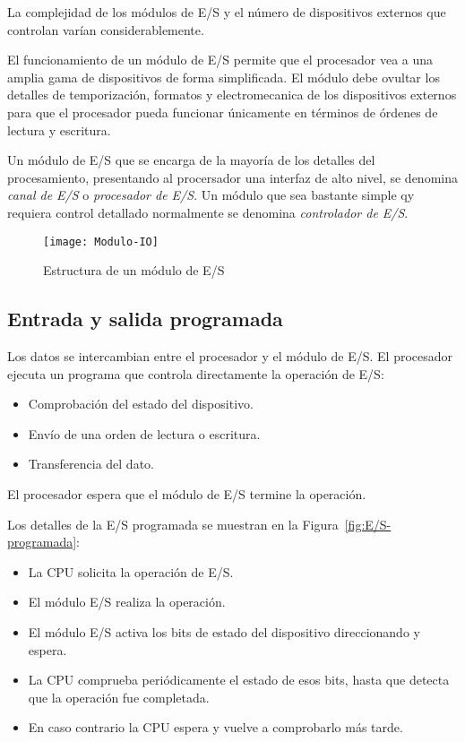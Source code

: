 La complejidad de los módulos de E/S y el número de dispositivos externos que controlan varían considerablemente.

El funcionamiento de un módulo de E/S permite que el procesador vea a una amplia gama de dispositivos de forma simplificada. El módulo debe ovultar los detalles de temporización, formatos y electromecanica de los dispositivos externos para que el procesador pueda funcionar únicamente en términos de órdenes de lectura y escritura.

Un módulo de E/S que se encarga de la mayoría de los detalles del procesamiento, presentando al procersador una interfaz de alto nivel, se denomina \textit{canal de E/S} o \textit{procesador de E/S}. Un módulo que sea bastante simple qy requiera control detallado normalmente se denomina \textit{controlador de E/S}.

\begin{figure}[h]
  \centering
  \texttt{[image: Modulo-IO]}
  \caption{Estructura de un módulo de E/S}\label{fig:Estructura-modulo-E/S}
\end{figure}

\subsection{Entrada y salida programada}

Los datos se intercambian entre el procesador y el módulo de E/S. El procesador ejecuta un programa que controla directamente la operación de E/S:\@
\begin{itemize}
  \item Comprobación del estado del dispositivo.
  \item Envío de una orden de lectura o escritura.
  \item Transferencia del dato.
\end{itemize}

El procesador espera que el módulo de E/S termine la operación.

Los detalles de la E/S programada se muestran en la Figura~\ref{fig:E/S-programada}:

\begin{itemize}
  \item La CPU solicita la operación de E/S.
  \item El módulo E/S realiza la operación.
  \item El módulo E/S activa los bits de estado del dispositivo direccionando y espera.
  \item La CPU comprueba periódicamente el estado de esos bits, hasta que detecta que la operación fue completada.
  \item En caso contrario la CPU espera y vuelve a comprobarlo más tarde.
\end{itemize}

